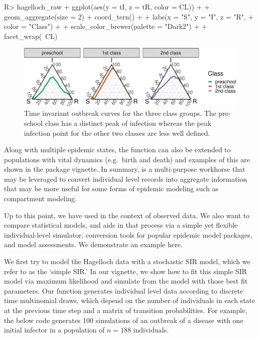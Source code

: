 \documentclass[
  shortnames]{jss}
\begin{document}
\begin{CodeChunk}
\begin{CodeInput}
R> hagelloch_raw %
+   ggplot(aes(y = tI, z = tR, color = CL)) +
+   geom_aggregate(size = 2) + coord_tern() +
+   labs(x = "S", y = "I", z = "R",
+        color = "Class") +
+   scale_color_brewer(palette = "Dark2") +
+   facet_wrap(~CL)
\end{CodeInput}
\begin{figure}[H]

{\centering \includegraphics{Figs/unnamed-chunk-10-1} 

}

\caption{\label{fig:tern-class-data}Time invariant outbreak curves for the three class groups.  The pre-school class has a distinct peak of infection whereas the peak infection point for the other two classes are less well defined.}\label{fig:unnamed-chunk-10}
\end{figure}
\end{CodeChunk}

Along with multiple epidemic states, the function
 can also be extended to populations with
vital dynamics (e.g.~birth and death) and examples of this are shown in
the package vignette. In summary,  is a
multi-purpose workhorse that may be leveraged to convert individual
level records into aggregate information that may be more useful for
some forms of epidemic modeling such as compartment modeling.

Up to this point, we have used  in the context of
observed data. We also want to compare statistical models, and
 aids in that process via a simple yet flexible
individual-level simulator, conversion tools for popular epidemic model
packages, and model assessments. We demonstrate an example here.

We first try to model the Hagelloch data with a stochastic SIR model,
which we refer to as the `simple SIR.' In our vignette, we show how to
fit this simple SIR model via maximum likelihood and simulate from the
model with those best fit parameters. Our function
 generates individual level data according to
discrete time multinomial draws, which depend on the number of
individuals in each state at the previous time step and a matrix of
transition probabilities. For example, the below code generates 100
simulations of an outbreak of a disease with one initial infector in a
population of \(n= 188\) individuals.
\end{document}
